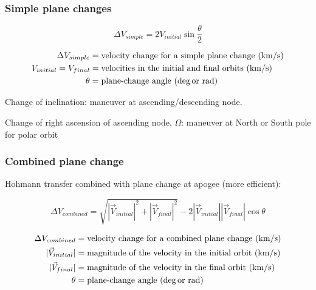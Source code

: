 \documentclass{article}
\begin{document}
\subsubsection{Simple plane changes}
\begin{multicols}{3}
	\begin{equation*}
	\boxed{\Delta V_{simple} = 2 V_{initial} \sin{\dfrac{\theta}{2}}}
	\end{equation*}

	\vfill\null
	\columnbreak
	
	\begin{align*}
	\Delta V_{simple} &= \text{velocity change for a simple plane change (\si{\km\per\second})}\\
	V_{initial} = V_{final} &= \text{velocities in the initial and final orbits (\si{\km\per\second})}\\
	\theta &= \text{plane-change angle (\si{\deg \text{or }\radian})}\\
	\end{align*}
\end{multicols}

Change of inclination: maneuver at ascending/descending node.

Change of right ascension of ascending node, $\Omega$: maneuver at North or South pole for polar orbit

\subsubsection{Combined plane change}
Hohmann transfer combined with plane change at apogee (more efficient):

\begin{equation*}
\boxed{\Delta V_{combined} = \sqrt{|\vec{V}_{initial}|^2 + |\vec{V}_{final}|^2} - 2|\vec{V}_{initial}||\vec{V}_{final}| \cos{\theta}}
\end{equation*}

\begin{align*}
\Delta V_{combined} &= \text{velocity change for a combined plane change (\si{\km\per\second})}\\
|\vec{V}_{initial}| &= \text{magnitude of the velocity in the initial orbit (\si{\km\per\second})}\\
|\vec{V}_{final}| &= \text{magnitude of the velocity in the final orbit (\si{\km\per\second})}\\
\theta &= \text{plane-change angle (\si{\deg \text{or }\radian})}\\
\end{align*}
\end{document}
